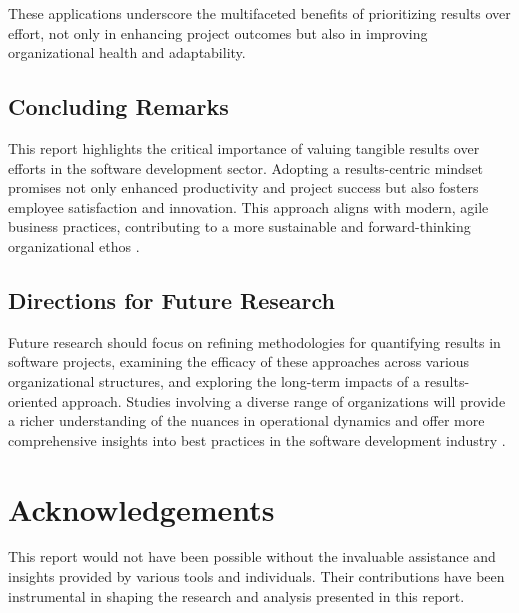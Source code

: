 \documentclass{article}
\begin{document}
These applications underscore the multifaceted benefits of prioritizing results over effort, not only in enhancing project outcomes but also in improving organizational health and adaptability.


\subsection{Concluding Remarks}
This report highlights the critical importance of valuing tangible results over efforts in the software development sector. Adopting a results-centric mindset promises not only enhanced productivity and project success but also fosters employee satisfaction and innovation. This approach aligns with modern, agile business practices, contributing to a more sustainable and forward-thinking organizational ethos \cite{Verbeeten2015}.

\subsection{Directions for Future Research}
Future research should focus on refining methodologies for quantifying results in software projects, examining the efficacy of these approaches across various organizational structures, and exploring the long-term impacts of a results-oriented approach. Studies involving a diverse range of organizations will provide a richer understanding of the nuances in operational dynamics and offer more comprehensive insights into best practices in the software development industry \cite{Chowdhury2015, BudacuPocatilu2018}.




\newpage

 


\section*{Acknowledgements}

This report would not have been possible without the invaluable assistance and insights provided by various tools and individuals. Their contributions have been instrumental in shaping the research and analysis presented in this report.
\end{document}
